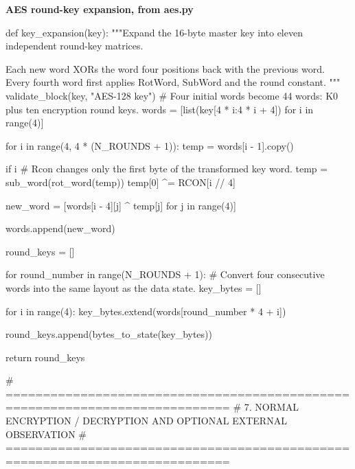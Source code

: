 \par\smallskip\noindent\textbf{AES round-key expansion, from aes.py}\par
\begin{lightcode}
def key_expansion(key):
    """Expand the 16-byte master key into eleven independent round-key matrices.

    Each new word XORs the word four positions back with the previous word.
    Every fourth word first applies RotWord, SubWord and the round constant.
    """
    validate_block(key, "AES-128 key")
    # Four initial words become 44 words: K0 plus ten encryption round keys.
    words = [list(key[4 * i:4 * i + 4]) for i in range(4)]

    for i in range(4, 4 * (N_ROUNDS + 1)):
        temp = words[i - 1].copy()

        if i %
            # Rcon changes only the first byte of the transformed key word.
            temp = sub_word(rot_word(temp))
            temp[0] ^= RCON[i // 4]

        new_word = [words[i - 4][j] ^ temp[j] for j in range(4)]

        words.append(new_word)

    round_keys = []

    for round_number in range(N_ROUNDS + 1):
        # Convert four consecutive words into the same layout as the data state.
        key_bytes = []

        for i in range(4):
            key_bytes.extend(words[round_number * 4 + i])

        round_keys.append(bytes_to_state(key_bytes))

    return round_keys


# ============================================================================
# 7. NORMAL ENCRYPTION / DECRYPTION AND OPTIONAL EXTERNAL OBSERVATION
# ============================================================================
\end{lightcode}

